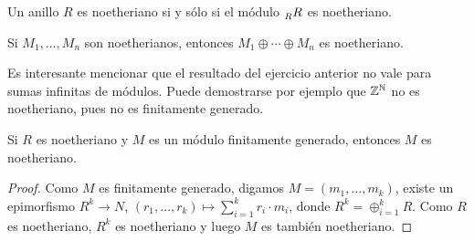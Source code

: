 \begin{exercise}
\label{xca:regular_noetheriano}
Un anillo $R$ es noetheriano si y sólo si el módulo $\prescript{}{R}R$ es noetheriano.	
\end{exercise}

\begin{exercise}
\label{xca:directa_noetheriano}
Si $M_1,\dots,M_n$ son noetherianos, entonces $M_1\oplus\cdots\oplus M_n$ es noetheriano. 	
\end{exercise}

Es interesante mencionar que el resultado del ejercicio anterior no vale para sumas infinitas de módulos. Puede demostrarse
por ejemplo que $\mathbb{Z}^{\mathbb{N}}$ no es noetheriano, pues no es finitamente generado. 

\begin{proposition}
Si $R$ es noetheriano y $M$ es un módulo finitamente generado, entonces $M$ es noetheriano.	
\end{proposition}

\begin{proof}
Como $M$ es finitamente generado, digamos $M=(m_1,\dots,m_k)$, existe un epimorfismo 
$R^k\to N$, $(r_1,\dots,r_k)\mapsto \sum_{i=1}^k r_i\cdot m_i$, donde
$R^k=\oplus_{i=1}^k R$. Como $R$ es noetheriano, $R^k$ es noetheriano y luego $M$ es también noetheriano.	
\end{proof}


